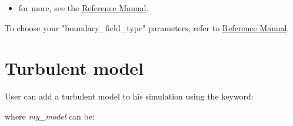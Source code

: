 {{\begin{itemize}
\item for more, see the \href{TRUST_Reference_Manual.pdf\#condlimbase}{\trust Reference Manual}.
\end{itemize}
}}

To choose your "boundary\_field\_type" parameters, refer to \href{TRUST_Reference_Manual.pdf\#frontfieldbase}{\trust Reference Manual}.


\section{Turbulent model}

User can add a turbulent model to his simulation using the keyword:

    \begin{center}
    \end{center}

where \textit{my\_model} can be:

